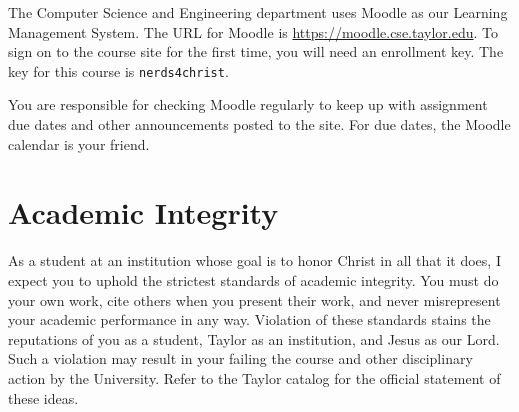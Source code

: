 \documentclass[11pt]{article}
\begin{document}
The Computer Science and Engineering department uses Moodle as our Learning Management
System. The URL for Moodle is \url{https://moodle.cse.taylor.edu}. To sign on to the course site
for the first time, you will need an enrollment key. The key for this course is
\texttt{nerds4christ}.

You are responsible for checking Moodle regularly to keep up with assignment due dates and
other announcements posted to the site. For due dates, the Moodle calendar is your friend.

\section{Academic Integrity}

As a student at an institution whose goal is to honor Christ in all that it does,
I expect you to uphold the strictest standards of academic integrity.
You must do your own work, cite others when you present their work,
and never misrepresent your academic performance in any way.
Violation of these standards stains the reputations of you as a student,
Taylor as an institution,
and Jesus as our Lord.
Such a violation may result in your failing the course
and other disciplinary action by the University.
Refer to the Taylor catalog for the official statement of these ideas.
\end{document}

